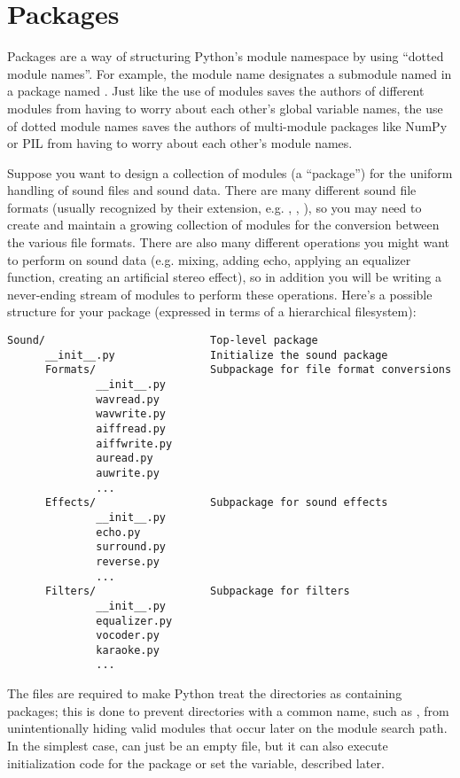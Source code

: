 \documentclass{manual}
\begin{document}
\section{Packages}

Packages are a way of structuring Python's module namespace
by using ``dotted module names''.  For example, the module name 
designates a submodule named  in a package named .  Just like the
use of modules saves the authors of different modules from having to
worry about each other's global variable names, the use of dotted
module names saves the authors of multi-module packages like NumPy or
PIL from having to worry about each other's module names.

Suppose you want to design a collection of modules (a ``package'') for
the uniform handling of sound files and sound data.  There are many
different sound file formats (usually recognized by their extension,
e.g. , , ), so you may need to create
and maintain a growing collection of modules for the conversion
between the various file formats.  There are also many different
operations you might want to perform on sound data (e.g. mixing,
adding echo, applying an equalizer function, creating an artificial
stereo effect), so in addition you will be writing a never-ending
stream of modules to perform these operations.  Here's a possible
structure for your package (expressed in terms of a hierarchical
filesystem):

\begin{verbatim}
Sound/                          Top-level package
      __init__.py               Initialize the sound package
      Formats/                  Subpackage for file format conversions
              __init__.py
              wavread.py
              wavwrite.py
              aiffread.py
              aiffwrite.py
              auread.py
              auwrite.py
              ...
      Effects/                  Subpackage for sound effects
              __init__.py
              echo.py
              surround.py
              reverse.py
              ...
      Filters/                  Subpackage for filters
              __init__.py
              equalizer.py
              vocoder.py
              karaoke.py
              ...
\end{verbatim}
The  files are required to make Python treat the
directories as containing packages; this is done to prevent
directories with a common name, such as , from
unintentionally hiding valid modules that occur later on the module
search path. In the simplest case,  can just be an
empty file, but it can also execute initialization code for the
package or set the  variable, described later.
\end{document}
